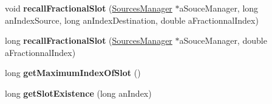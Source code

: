 \begin{DoxyCompactItemize}
\item 
\hypertarget{class_sources_preset_a9fba984996f1db1aff480cfa37e81c51}{void {\bfseries recall\-Fractional\-Slot} (\hyperlink{class_sources_manager}{Sources\-Manager} $\ast$a\-Souce\-Manager, long an\-Index\-Source, long an\-Index\-Destination, double a\-Fractionnal\-Index)}\label{class_sources_preset_a9fba984996f1db1aff480cfa37e81c51}

\item 
\hypertarget{class_sources_preset_ae71bda191fbbeb78b3782084f630dd0a}{long {\bfseries recall\-Fractional\-Slot} (\hyperlink{class_sources_manager}{Sources\-Manager} $\ast$a\-Souce\-Manager, double a\-Fractionnal\-Index)}\label{class_sources_preset_ae71bda191fbbeb78b3782084f630dd0a}

\item 
\hypertarget{class_sources_preset_aed8d2ab6ab9a0a3aa56f559b1fd01c44}{long {\bfseries get\-Maximum\-Index\-Of\-Slot} ()}\label{class_sources_preset_aed8d2ab6ab9a0a3aa56f559b1fd01c44}

\item 
\hypertarget{class_sources_preset_abb55020be21bb40e6fcfa561608048b6}{long {\bfseries get\-Slot\-Existence} (long an\-Index)}\label{class_sources_preset_abb55020be21bb40e6fcfa561608048b6}

\end{DoxyCompactItemize}
